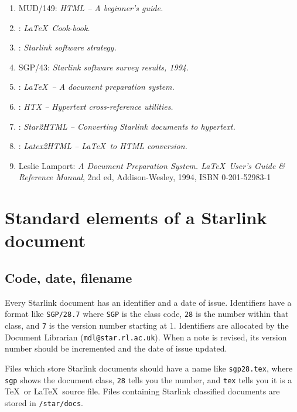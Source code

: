 \documentclass[twoside,11pt,nolof]{starlink}
\begin{document}
\begin{enumerate}
\item MUD/149: \emph{HTML -- A beginner's guide.}
\item {}: \emph{\LaTeX\ Cook-book.}
\item {}: \emph{Starlink software strategy.}
\item SGP/43: \emph{Starlink software survey results, 1994.}
\item {}: \emph{\LaTeX\ -- A document preparation system.}
\item {}: \emph{HTX -- Hypertext cross-reference utilities.}
\item {}: \emph{Star2HTML -- Converting Starlink documents
  to hypertext.}
\item {}: \emph{Latex2HTML -- \LaTeX\ to HTML conversion.}
\item Leslie Lamport: \emph{A Document Preparation System. \LaTeX\ User's
Guide \& Reference Manual}, 2nd ed, Addison-Wesley, 1994,
ISBN 0-201-52983-1
\end{enumerate}

\appendix

\newpage

\section{Standard elements of a Starlink document}

\subsection{Code, date, filename}

Every Starlink document has an identifier and a date of issue.
Identifiers have a format like \texttt{SGP/28.7} where \texttt{SGP} is the class code,
\texttt{28} is the number within that class, and \texttt{7} is the version number
starting at 1.
Identifiers are allocated by the Document Librarian
(\texttt{mdl@star.rl.ac.uk}).
When a note is revised, its version number should be incremented and the
date of issue updated.

Files which store Starlink documents should have a name like \texttt{sgp28.tex},
where \texttt{sgp} shows the document class, \texttt{28} tells you the number, and
\texttt{tex} tells you it is a \TeX\ or \LaTeX\ source file.
Files containing Starlink classified documents are stored in \texttt{/star/docs}.
\end{document}
